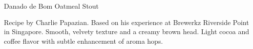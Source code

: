 \begin{recipe}{Danado de Bom Oatmeal Stout}

\begin{aboutblock}
Recipe by Charlie Papazian. Based on his experience at Brewerkz Riverside
Point in Singapore. Smooth, velvety texture and a creamy brown head. Light cocoa
and coffee flavor with subtle enhancement of aroma hops.
\end{aboutblock}


\begin{methodandtiming}

\begin{mashsteps}
\end{mashsteps}

\begin{fermentationsteps}
\end{fermentationsteps}

\end{methodandtiming}

\recipebreak

\begin{ingredientsblock}

\begin{malts}
\end{malts}

\begin{hops}
\end{hops}


\end{ingredientsblock}

\end{recipe}

